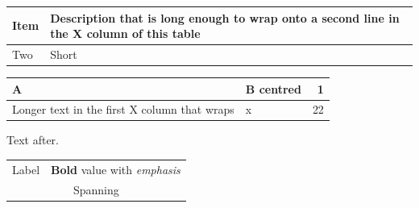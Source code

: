 \documentclass[11pt]{article}
\begin{document}
\noindent\begin{tabularx}{\textwidth}{@{}lX@{}}
\toprule
Item & Description that is long enough to wrap onto a second line in the X column of this table \\
\midrule
Two & Short \\
\bottomrule
\end{tabularx}

\begin{tabularx}{0.8\linewidth}{|X|>{\centering\arraybackslash}X|r|}
\hline
A & B centred & 1 \\
\hline
Longer text in the first X column that wraps & x & 22 \\
\hline
\end{tabularx}

Text after.
\begin{tabularx}{\textwidth}{p{2.8cm}X}
Label & \textbf{Bold} value with \emph{emphasis} \\
\multicolumn{2}{c}{Spanning} \\
\end{tabularx}
\end{document}
